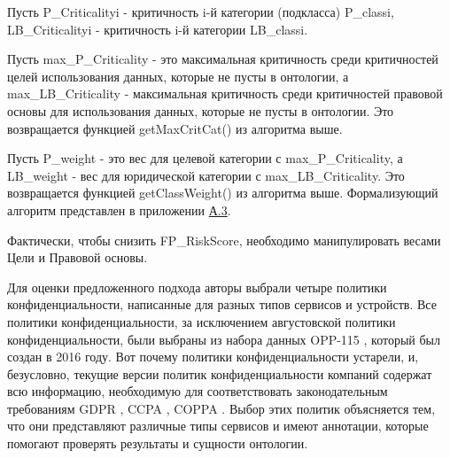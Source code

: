 \documentclass[../main]{subfiles}
\begin{document}
Пусть P\_Criticalityi - критичность i-й категории (подкласса) P\_classi, LB\_Criticalityi - критичность i-й категории LB\_classi.

Пусть max\_P\_Criticality - это максимальная критичность среди критичностей целей использования данных, которые не пусты в онтологии, а max\_LB\_Criticality - максимальная критичность среди критичностей правовой основы для использования данных, которые не пусты в онтологии. Это возвращается функцией getMaxCritCat() из алгоритма выше. 

Пусть P\_weight - это вес для целевой категории с max\_P\_Criticality, а LB\_weight - вес для юридической категории с max\_LB\_Criticality. Это возвращается функцией getClassWeight() из алгоритма выше. Формализующий алгоритм представлен в приложении \hyperref[sec:appendix13]{А.3}.

Фактически, чтобы снизить FP\_RiskScore, необходимо манипулировать весами Цели и Правовой основы. 

Для оценки предложенного подхода авторы выбрали четыре политики конфиденциальности, написанные для разных типов сервисов и устройств. Все политики конфиденциальности, за исключением августовской политики конфиденциальности, были выбраны из набора данных OPP-115 \cite{MDPI23}, который был создан в 2016 году. Вот почему политики конфиденциальности устарели, и, безусловно, текущие версии политик конфиденциальности компаний содержат всю информацию, необходимую для соответствовать законодательным требованиям GDPR \cite{GDPR}, CCPA \cite{MDPI23}, COPPA \cite{MDPI2}. Выбор этих политик объясняется тем, что они представляют различные типы сервисов и имеют аннотации, которые помогают проверять результаты и сущности онтологии. 
\end{document}
